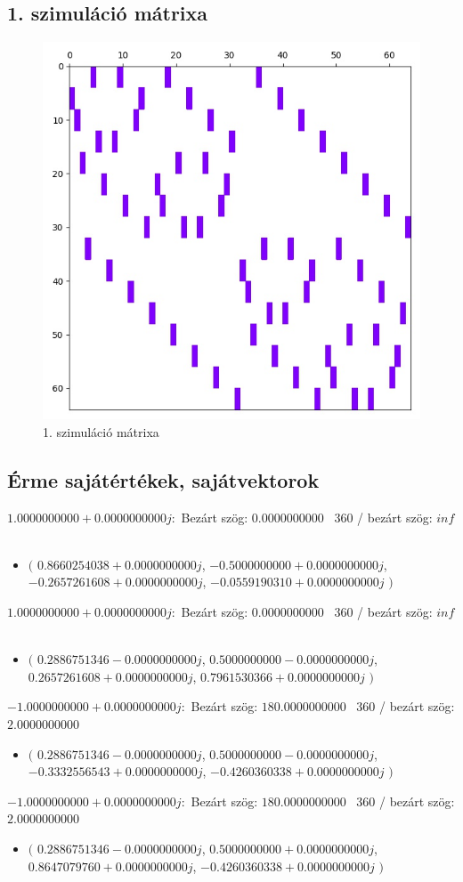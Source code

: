 \documentclass[14pt,a4paper]{article}
\begin{document}
\subsection{1. szimuláció mátrixa}
\begin{figure}[H]
\centering
\includegraphics[width = 0.7\columnwidth]{sim_01/simulation_matrix.jpg}
\caption{1. szimuláció mátrixa}
\end{figure}
\subsection{Érme sajátértékek, sajátvektorok}
$1.0000000000+0.0000000000j$:\
Bezárt szög: $0.0000000000$ \
360 / bezárt szög: $inf$\
\begin{itemize}
\item
$\big($
$0.8660254038+0.0000000000j$, $-0.5000000000+0.0000000000j$, $-0.2657261608+0.0000000000j$, $-0.0559190310+0.0000000000j$
$\big)$
\end{itemize}
$1.0000000000+0.0000000000j$:\
Bezárt szög: $0.0000000000$ \
360 / bezárt szög: $inf$\
\begin{itemize}
\item
$\big($
$0.2886751346-0.0000000000j$, $0.5000000000-0.0000000000j$, $0.2657261608+0.0000000000j$, $0.7961530366+0.0000000000j$
$\big)$
\end{itemize}
$-1.0000000000+0.0000000000j$:\
Bezárt szög: $180.0000000000$ \
360 / bezárt szög: $2.0000000000$\
\begin{itemize}
\item
$\big($
$0.2886751346-0.0000000000j$, $0.5000000000-0.0000000000j$, $-0.3332556543+0.0000000000j$, $-0.4260360338+0.0000000000j$
$\big)$
\end{itemize}
$-1.0000000000+0.0000000000j$:\
Bezárt szög: $180.0000000000$ \
360 / bezárt szög: $2.0000000000$\
\begin{itemize}
\item
$\big($
$0.2886751346-0.0000000000j$, $0.5000000000+0.0000000000j$, $0.8647079760+0.0000000000j$, $-0.4260360338+0.0000000000j$
$\big)$
\end{itemize}
\end{document}
